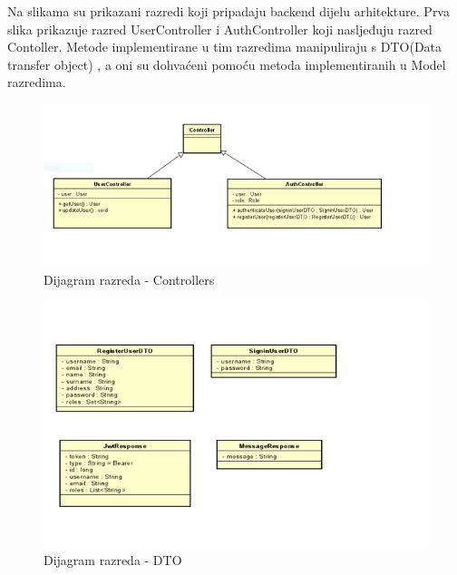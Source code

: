 		Na slikama su prikazani razredi koji pripadaju backend dijelu arhitekture. Prva slika prikazuje razred UserController i AuthController koji nasljeđuju razred Contoller. Metode implementirane u tim razredima manipuliraju s DTO(Data transfer object) , a oni su dohvaćeni pomoću metoda implementiranih u Model razredima.
		
			
			\begin{figure}[H]
				\includegraphics[scale=1]{slike/DijagramRazredaC.PNG} %
				\centering
				\caption{Dijagram razreda - Controllers}
				\label{fig:dijagramRazredaC}
			\end{figure}
		
			\begin{figure}[H]
				\includegraphics[scale=1]{slike/DijagramRazredaD.PNG} %
				\centering
				\caption{Dijagram razreda - DTO}
				\label{fig:dijagramRazredaC}
			\end{figure}
	

